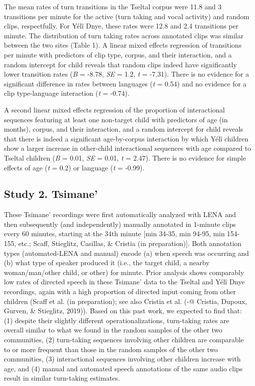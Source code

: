 \documentclass[10pt, letterpaper]{article}
\begin{document}
The mean rates of turn transitions in the Tseltal corpus were 11.8 and 3
transitions per minute for the active (turn taking and vocal activity)
and random clips, respectfully. For Yélî Dnye, these rates were 12.8 and
2.4 transitions per minute. The distribution of turn taking rates across
annotated clips was similar between the two sites (Table 1). A linear
mixed effects regression of transitions per minute with predictors of
clip type, corpus, and their interaction, and a random intercept for
child reveals that random clips indeed have significantly lower
transition rates (\emph{B} = -8.78, \emph{SE} = 1.2, \emph{t} = -7.31).
There is no evidence for a significant difference in rates between
languages (\emph{t} = 0.54) and no evidence for a clip type-language
interaction (\emph{t} = -0.74).

A second linear mixed effects regression of the proportion of
interactional sequences featuring at least one non-target child with
predictors of age (in months), corpus, and their interaction, and a
random intercept for child reveals that there is indeed a significant
age-by-corpus interaction by which Yélî children show a larger increase
in other-child interactional sequences with age compared to Tseltal
children (\emph{B} = 0.01, \emph{SE} = 0.01, \emph{t} = 2.47). There is
no evidence for simple effects of age (\emph{t} = 0.2) or language
(\emph{t} = -0.99).

\hypertarget{study-2.-tsimane}{%
\subsection{Study 2. Tsimane'}\label{study-2.-tsimane}}

These Tsimane' recordings were first automatically analyzed with LENA
and then subsequently (and independently) manually annotated in 1-minute
clips every 60 minutes, starting at the 34th minute {[}min 34-35, min
94-95, min 154-155, etc.; Scaff, Stieglitz, Casillas, \& Cristia (in
preparation){]}. Both annotation types (automated-LENA and manual)
encode (a) when speech was occurring and (b) what type of speaker
produced it (i.e., the target child, a nearby woman/man/other child, or
other) for minute. Prior analysis shows comparably low rates of directed
speech in these Tsimane' data to the Tseltal and Yélî Dnye recordings,
again with a high proportion of directed input coming from other
children (Scaff et al. (in preparation); see also Cristia et al. (-@
Cristia, Dupoux, Gurven, \& Stieglitz, 2019)). Based on this past work,
we expected to find that: (1) despite their slightly different
operationalizations, turn-taking rates are overall similar to what we
found in the random samples of the other two communities, (2)
turn-taking sequences involving other children are comparable to or more
frequent than those in the random samples of the other two communities,
(3) interactional sequences involving other children increase with age,
and (4) manual and automated speech annotations of the same audio clips
result in similar turn-taking estimates.
\end{document}
